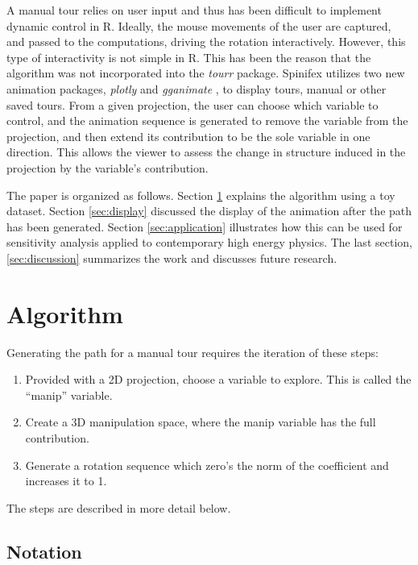 \documentclass{monashthesis}
\begin{document}
A manual tour relies on user input and thus has been difficult to
implement dynamic control in R. Ideally, the mouse movements of the user
are captured, and passed to the computations, driving the rotation
interactively. However, this type of interactivity is not simple in R.
This has been the reason that the algorithm was not incorporated into
the \emph{tourr} package. Spinifex utilizes two new animation packages,
\emph{plotly} \autocite{sievert_plotly_2018} and \emph{gganimate}
\autocite{pedersen_gganimate:_2019}, to display tours, manual or other
saved tours. From a given projection, the user can choose which variable
to control, and the animation sequence is generated to remove the
variable from the projection, and then extend its contribution to be the
sole variable in one direction. This allows the viewer to assess the
change in structure induced in the projection by the variable's
contribution.

The paper is organized as follows. Section \ref{sec:algorithm} explains
the algorithm using a toy dataset. Section \ref{sec:display} discussed
the display of the animation after the path has been generated. Section
\ref{sec:application} illustrates how this can be used for sensitivity
analysis applied to contemporary high energy physics. The last section,
\ref{sec:discussion} summarizes the work and discusses future research.

\section{Algorithm}\label{sec:algorithm}

Generating the path for a manual tour requires the iteration of these
steps:

\begin{enumerate}
\def\labelenumi{\arabic{enumi}.}
\tightlist
\item
  Provided with a 2D projection, choose a variable to explore. This is
  called the ``manip'' variable.
\item
  Create a 3D manipulation space, where the manip variable has the full
  contribution.
\item
  Generate a rotation sequence which zero's the norm of the coefficient
  and increases it to 1.
\end{enumerate}

The steps are described in more detail below.

\subsection{Notation}\label{notation}
\end{document}

